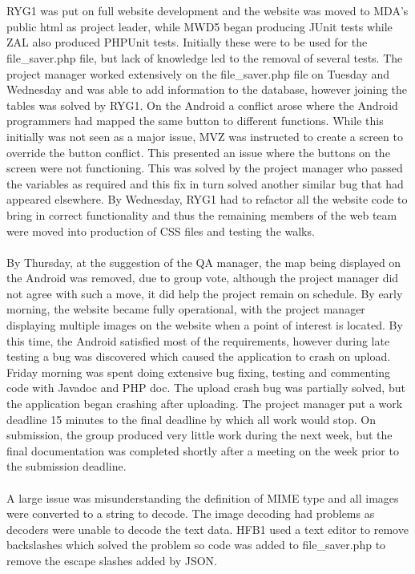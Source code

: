 \documentclass[12pt]{article}
\begin{document}
\\\\
RYG1 was put on full website development and the website was moved to MDA's public html as project leader, while MWD5 began producing JUnit tests while ZAL also produced PHPUnit tests. Initially these were to be used for the file\_saver.php file, but lack of knowledge led to the removal of several tests. The project manager worked extensively on the file\_saver.php file on Tuesday and Wednesday and was able to add information to the database, however joining the tables was solved by RYG1. On the Android a conflict arose where the Android programmers had mapped the same button to different functions. While this initially was not seen as a major issue, MVZ was instructed to create a screen to override the button conflict. This presented an issue where the buttons on the screen were not functioning. This was solved by the project manager who passed the variables as required and this fix in turn solved another similar bug that had appeared elsewhere. By Wednesday, RYG1 had to refactor all the website code to bring in correct functionality and thus the remaining members of the web team were moved into production of CSS files and testing the walks. \\\\
By Thursday, at the suggestion of the QA manager, the map being displayed on the Android was removed, due to group vote, although the project manager did not agree with such a move, it did help the project remain on schedule. By early morning, the website became fully operational, with the project manager displaying multiple images on the website when a point of interest is located. By this time, the Android satisfied most of the requirements, however during late testing a bug was discovered which caused the application to crash on upload. Friday morning was spent doing extensive bug fixing, testing and commenting code with Javadoc and PHP doc. The upload crash bug was partially solved, but the application began crashing after uploading. The project manager put a work deadline 15 minutes to the final deadline by which all work would stop. On submission, the group produced very little work during the next week, but the final documentation was completed shortly after a meeting on the week prior to the submission deadline.
\\\\
A large issue was misunderstanding the definition of MIME type and all images were converted to a string to decode. The image decoding had problems as decoders were unable to decode the text data. HFB1 used a text editor to remove backslashes which solved the problem so code was added to file\_saver.php to remove the escape slashes added by JSON.
\newpage 
\end{document}
